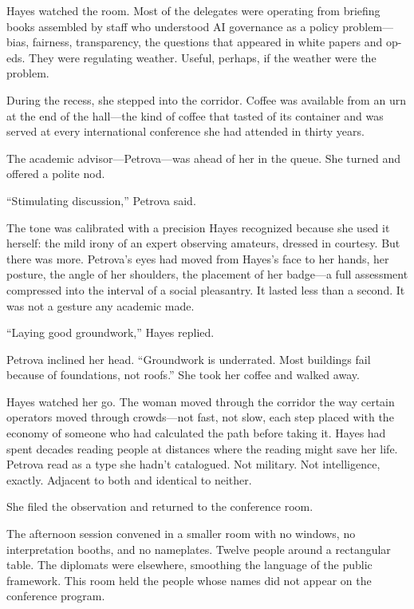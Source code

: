 Hayes watched the room. Most of the delegates were operating from briefing books assembled by staff who understood AI governance as a policy problem---bias, fairness, transparency, the questions that appeared in white papers and op-eds. They were regulating weather. Useful, perhaps, if the weather were the problem.

During the recess, she stepped into the corridor. Coffee was available from an urn at the end of the hall---the kind of coffee that tasted of its container and was served at every international conference she had attended in thirty years.

The academic advisor---Petrova---was ahead of her in the queue. She turned and offered a polite nod.

``Stimulating discussion,'' Petrova said.

The tone was calibrated with a precision Hayes recognized because she used it herself: the mild irony of an expert observing amateurs, dressed in courtesy. But there was more. Petrova's eyes had moved from Hayes's face to her hands, her posture, the angle of her shoulders, the placement of her badge---a full assessment compressed into the interval of a social pleasantry. It lasted less than a second. It was not a gesture any academic made.

``Laying good groundwork,'' Hayes replied.

Petrova inclined her head. ``Groundwork is underrated. Most buildings fail because of foundations, not roofs.'' She took her coffee and walked away.

Hayes watched her go. The woman moved through the corridor the way certain operators moved through crowds---not fast, not slow, each step placed with the economy of someone who had calculated the path before taking it. Hayes had spent decades reading people at distances where the reading might save her life. Petrova read as a type she hadn't catalogued. Not military. Not intelligence, exactly. Adjacent to both and identical to neither.

She filed the observation and returned to the conference room.

\scenebreak

The afternoon session convened in a smaller room with no windows, no interpretation booths, and no nameplates. Twelve people around a rectangular table. The diplomats were elsewhere, smoothing the language of the public framework. This room held the people whose names did not appear on the conference program.

